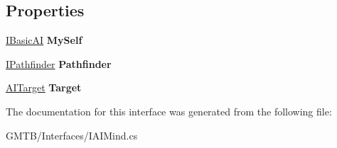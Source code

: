 \subsection*{Properties}
\begin{DoxyCompactItemize}
\item 
\mbox{\label{interface_g_m_t_b_1_1_interfaces_1_1_i_a_i_mind_a3092150035d70aab28b252dc246dd7b3}} 
\mbox{\hyperlink{interface_g_m_t_b_1_1_interfaces_1_1_i_basic_a_i}{I\+Basic\+AI}} {\bfseries My\+Self}
\item 
\mbox{\label{interface_g_m_t_b_1_1_interfaces_1_1_i_a_i_mind_ad5b4dd8415974a6b0f597a6486100fb3}} 
\mbox{\hyperlink{interface_g_m_t_b_1_1_interfaces_1_1_i_pathfinder}{I\+Pathfinder}} {\bfseries Pathfinder}
\item 
\mbox{\label{interface_g_m_t_b_1_1_interfaces_1_1_i_a_i_mind_a2a6114a9c08b51d2bbf9bc8979721b63}} 
\mbox{\hyperlink{interface_g_m_t_b_1_1_interfaces_1_1_a_i_target}{A\+I\+Target}} {\bfseries Target}
\end{DoxyCompactItemize}


The documentation for this interface was generated from the following file\+:\begin{DoxyCompactItemize}
\item 
G\+M\+T\+B/\+Interfaces/I\+A\+I\+Mind.\+cs\end{DoxyCompactItemize}
